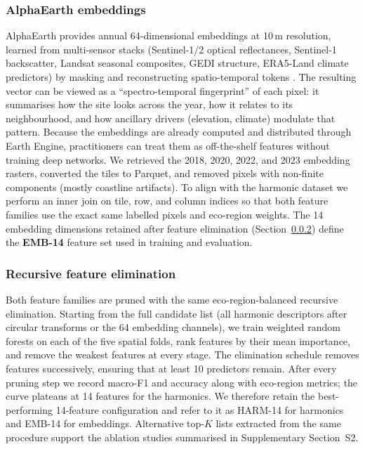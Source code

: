 \documentclass[utf8]{FrontiersinHarvard}
\begin{document}
\subsubsection{AlphaEarth embeddings}
AlphaEarth provides annual 64-dimensional embeddings at 10\,m resolution, learned from multi-sensor stacks (Sentinel-1/2 optical reflectances, Sentinel-1 backscatter, Landsat seasonal composites, GEDI structure, ERA5-Land climate predictors) by masking and reconstructing spatio-temporal tokens \citep{AlphaEarth2025}. The resulting vector can be viewed as a “spectro-temporal fingerprint” of each pixel: it summarises how the site looks across the year, how it relates to its neighbourhood, and how ancillary drivers (elevation, climate) modulate that pattern. Because the embeddings are already computed and distributed through Earth Engine, practitioners can treat them as off-the-shelf features without training deep networks. We retrieved the 2018, 2020, 2022, and 2023 embedding rasters, converted the tiles to Parquet, and removed pixels with non-finite components (mostly coastline artifacts). To align with the harmonic dataset we perform an inner join on tile, row, and column indices so that both feature families use the exact same labelled pixels and eco-region weights. The 14 embedding dimensions retained after feature elimination (Section~\ref{subsubsec:rfe}) define the \textbf{EMB-14} feature set used in training and evaluation.

\subsubsection{Recursive feature elimination}
\label{subsubsec:rfe}
Both feature families are pruned with the same eco-region-balanced recursive elimination. Starting from the full candidate list (all harmonic descriptors after circular transforms or the 64 embedding channels), we train weighted random forests on each of the five spatial folds, rank features by their mean importance, and remove the weakest features at every stage. The elimination schedule removes features successively, ensuring that at least 10 predictors remain. After every pruning step we record macro-F1 and accuracy along with eco-region metrics; the curve plateaus at 14 features for the harmonics. We therefore retain the best-performing 14-feature configuration and refer to it as HARM-14 for harmonics and EMB-14 for embeddings. Alternative top-$K$ lists extracted from the same procedure support the ablation studies summarised in Supplementary Section~S2.
\end{document}
